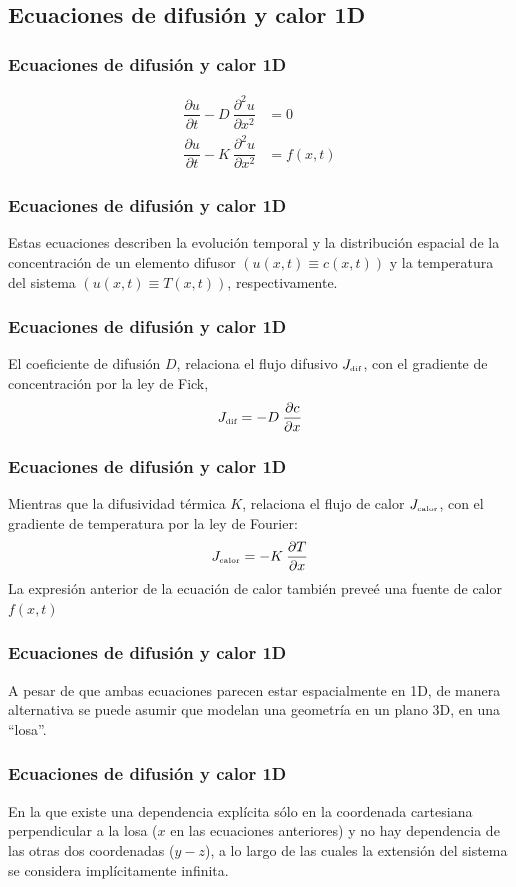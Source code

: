 \documentclass[12pt]{beamer}
\begin{document}
\subsection{Ecuaciones de difusión y calor 1D}

\begin{frame}
\frametitle{Ecuaciones de difusión y calor 1D}
\begin{align}
\dfrac{\partial u}{\partial t} - D \: \dfrac{\partial^{2} u}{\partial x^{2}} &= 0
\label{eq:ecuacion_13_36} \\
\dfrac{\partial u}{\partial t} - K \: \dfrac{\partial^{2} u}{\partial x^{2}} &= f(x, t)
\label{eq:ecuacion_13_37}
\end{align}
\end{frame}
\begin{frame}
\frametitle{Ecuaciones de difusión y calor 1D}
Estas ecuaciones describen la evolución temporal y la distribución espacial de la concentración de un elemento difusor $(u (x, t) \equiv c (x, t))$ y la temperatura del sistema $(u (x, t) \equiv T(x,t))$, respectivamente.
\end{frame}
\begin{frame}
\frametitle{Ecuaciones de difusión y calor 1D}
El coeficiente de difusión $D$, relaciona el flujo difusivo $J_{\text{\tiny{dif}}}$, con el gradiente de concentración por la ley de Fick,
\begin{align*}
J_{\text{\tiny{dif}}} = - D \: \dfrac{\partial c}{\partial x}
\end{align*}
\end{frame}
\begin{frame}
\frametitle{Ecuaciones de difusión y calor 1D}
Mientras que la difusividad térmica $K$, relaciona el flujo de calor $J_{\text{\tiny{calor}}}$, con el gradiente de temperatura por la ley de Fourier:
\begin{align*}
J_{\text{\tiny{calor}}} = - K \: \dfrac{\partial T}{\partial x}
\end{align*}
La expresión anterior de la ecuación de calor también preveé una fuente de calor $f (x, t)$
\end{frame}
\begin{frame}
\frametitle{Ecuaciones de difusión y calor 1D}
A pesar de que ambas ecuaciones parecen estar espacialmente en 1D, de manera alternativa se puede asumir que modelan una geometría en un plano 3D, en una \enquote{losa}.
\end{frame}
\begin{frame}
\frametitle{Ecuaciones de difusión y calor 1D}
En la que existe una dependencia explícita sólo en la coordenada cartesiana perpendicular a la losa ($x$ en las ecuaciones anteriores) y no hay dependencia de las otras dos coordenadas ($y-z$), a lo largo de las cuales la extensión del sistema se considera implícitamente infinita.
\end{frame}
\end{document}
